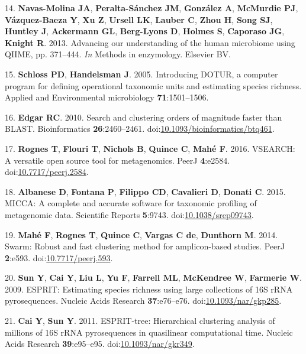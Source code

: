 \documentclass[11pt,]{article}
\begin{document}
\hypertarget{ref-NavasMolina2013}{}
14. \textbf{Navas-Molina JA}, \textbf{Peralta-Sánchez JM},
\textbf{González A}, \textbf{McMurdie PJ}, \textbf{Vázquez-Baeza Y},
\textbf{Xu Z}, \textbf{Ursell LK}, \textbf{Lauber C}, \textbf{Zhou H},
\textbf{Song SJ}, \textbf{Huntley J}, \textbf{Ackermann GL},
\textbf{Berg-Lyons D}, \textbf{Holmes S}, \textbf{Caporaso JG},
\textbf{Knight R}. 2013. Advancing our understanding of the human
microbiome using QIIME, pp. 371--444. \emph{In} Methods in enzymology.
Elsevier BV.

\hypertarget{ref-Schloss2005}{}
15. \textbf{Schloss PD}, \textbf{Handelsman J}. 2005. Introducing DOTUR,
a computer program for defining operational taxonomic units and
estimating species richness. Applied and Environmental microbiology
\textbf{71}:1501--1506.

\hypertarget{ref-Edgar2010}{}
16. \textbf{Edgar RC}. 2010. Search and clustering orders of magnitude
faster than BLAST. Bioinformatics \textbf{26}:2460--2461.
doi:\href{https://doi.org/10.1093/bioinformatics/btq461}{10.1093/bioinformatics/btq461}.

\hypertarget{ref-Rognes2016}{}
17. \textbf{Rognes T}, \textbf{Flouri T}, \textbf{Nichols B},
\textbf{Quince C}, \textbf{Mahé F}. 2016. VSEARCH: A versatile open
source tool for metagenomics. PeerJ \textbf{4}:e2584.
doi:\href{https://doi.org/10.7717/peerj.2584}{10.7717/peerj.2584}.

\hypertarget{ref-Albanese2015}{}
18. \textbf{Albanese D}, \textbf{Fontana P}, \textbf{Filippo CD},
\textbf{Cavalieri D}, \textbf{Donati C}. 2015. MICCA: A complete and
accurate software for taxonomic profiling of metagenomic data.
Scientific Reports \textbf{5}:9743.
doi:\href{https://doi.org/10.1038/srep09743}{10.1038/srep09743}.

\hypertarget{ref-Mah2014}{}
19. \textbf{Mahé F}, \textbf{Rognes T}, \textbf{Quince C},
\textbf{Vargas C de}, \textbf{Dunthorn M}. 2014. Swarm: Robust and fast
clustering method for amplicon-based studies. PeerJ \textbf{2}:e593.
doi:\href{https://doi.org/10.7717/peerj.593}{10.7717/peerj.593}.

\hypertarget{ref-Sun2009}{}
20. \textbf{Sun Y}, \textbf{Cai Y}, \textbf{Liu L}, \textbf{Yu F},
\textbf{Farrell ML}, \textbf{McKendree W}, \textbf{Farmerie W}. 2009.
ESPRIT: Estimating species richness using large collections of 16S rRNA
pyrosequences. Nucleic Acids Research \textbf{37}:e76--e76.
doi:\href{https://doi.org/10.1093/nar/gkp285}{10.1093/nar/gkp285}.

\hypertarget{ref-Cai2011}{}
21. \textbf{Cai Y}, \textbf{Sun Y}. 2011. ESPRIT-tree: Hierarchical
clustering analysis of millions of 16S rRNA pyrosequences in quasilinear
computational time. Nucleic Acids Research \textbf{39}:e95--e95.
doi:\href{https://doi.org/10.1093/nar/gkr349}{10.1093/nar/gkr349}.
\end{document}
